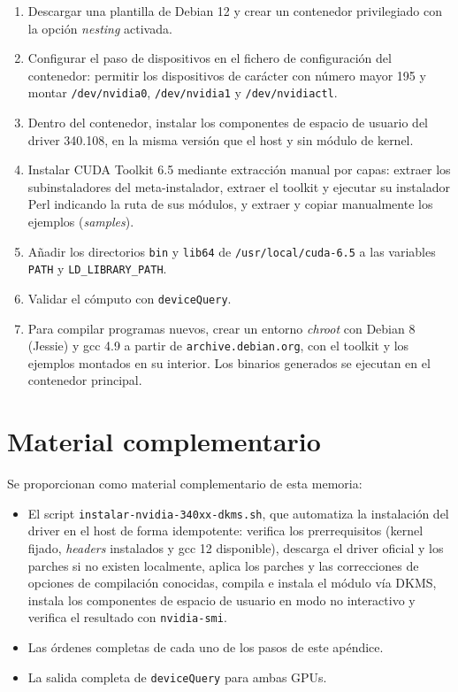 \begin{enumerate}
    \item Descargar una plantilla de Debian 12 y crear un contenedor privilegiado con la opción \textit{nesting} activada.
    \item Configurar el paso de dispositivos en el fichero de configuración del contenedor: permitir los dispositivos de carácter con número mayor 195 y montar \texttt{/dev/nvidia0}, \texttt{/dev/nvidia1} y \texttt{/dev/nvidiactl}.
    \item Dentro del contenedor, instalar los componentes de espacio de usuario del driver 340.108, en la misma versión que el host y sin módulo de kernel.
    \item Instalar CUDA Toolkit 6.5 mediante extracción manual por capas: extraer los subinstaladores del meta-instalador, extraer el toolkit y ejecutar su instalador Perl indicando la ruta de sus módulos, y extraer y copiar manualmente los ejemplos (\textit{samples}).
    \item Añadir los directorios \texttt{bin} y \texttt{lib64} de \texttt{/usr/local/cuda-6.5} a las variables \texttt{PATH} y \texttt{LD\_LIBRARY\_PATH}.
    \item Validar el cómputo con \texttt{deviceQuery}.
    \item Para compilar programas nuevos, crear un entorno \textit{chroot} con Debian 8 (Jessie) y gcc 4.9 a partir de \texttt{archive.debian.org}, con el toolkit y los ejemplos montados en su interior. Los binarios generados se ejecutan en el contenedor principal.
\end{enumerate}

\section{Material complementario} \label{sec:material-complementario}

Se proporcionan como material complementario de esta memoria:

\begin{itemize}
    \item El script \texttt{instalar-nvidia-340xx-dkms.sh}, que automatiza la instalación del driver en el host de forma idempotente: verifica los prerrequisitos (kernel fijado, \textit{headers} instalados y gcc 12 disponible), descarga el driver oficial y los parches si no existen localmente, aplica los parches y las correcciones de opciones de compilación conocidas, compila e instala el módulo vía DKMS, instala los componentes de espacio de usuario en modo no interactivo y verifica el resultado con \texttt{nvidia-smi}.
    \item Las órdenes completas de cada uno de los pasos de este apéndice.
    \item La salida completa de \texttt{deviceQuery} para ambas GPUs.
\end{itemize}
